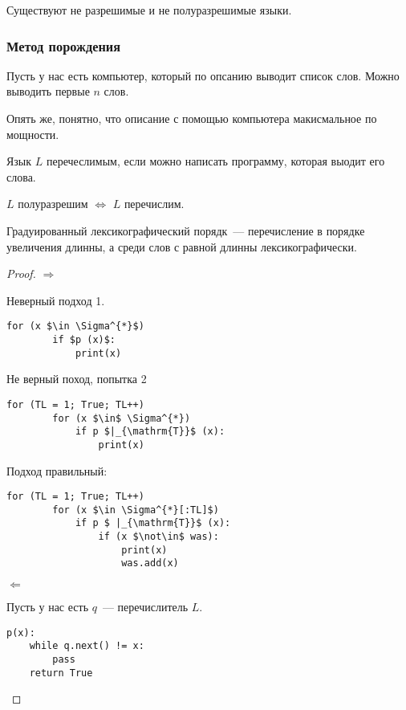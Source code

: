 Существуют не разрешимые и не полуразрешимые языки.

\subsubsection*{Метод порождения}

Пусть у нас есть компьютер, который по опсанию выводит список слов. Можно выводить первые $n$ слов.

Опять же, понятно, что описание с помощью компьютера макисмальное по мощности.

\begin{definition}
    Язык $L$ перечеслимым, если можно написать программу, которая выодит его слова.
\end{definition}

\begin{theorem}
    $L$ полуразрешим $\iff$ $L$ перечислим.
\end{theorem}

\begin{definition}
    Градуированный лексикографический порядк~--- перечисление  в порядке увеличения длинны, а среди слов с равной длинны лексикографически.
\end{definition}


\begin{proof}
    $\Longrightarrow$

    Неверный подход 1.
\begin{lstlisting}[mathescape=true]
    for (x $\in \Sigma^{*}$)
        if $p (x)$:
            print(x)
\end{lstlisting}

Не верный поход, попытка 2
\begin{lstlisting}[mathescape=true]
    for (TL = 1; True; TL++)
        for (x $\in$ \Sigma^{*})
            if p $|_{\mathrm{T}}$ (x):
                print(x)
\end{lstlisting}

Подход правильный:
\begin{lstlisting}[mathescape=true]
    for (TL = 1; True; TL++)
        for (x $\in \Sigma^{*}[:TL]$)
            if p $ |_{\mathrm{T}}$ (x):
                if (x $\not\in$ was):
                    print(x)
                    was.add(x)
\end{lstlisting}


$\Longleftarrow $

Пусть у нас есть $q$~--- перечислитель $L$.
\begin{lstlisting}[mathescape=true]
p(x):
    while q.next() != x:
        pass
    return True
\end{lstlisting}
\end{proof}

